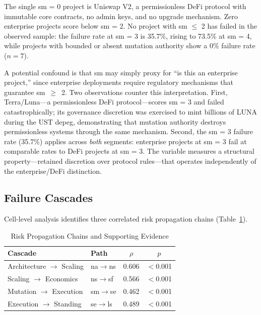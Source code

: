 \documentclass[conference]{IEEEtran}
\begin{document}
The single sm = 0 project is Uniswap V2, a permissionless DeFi protocol with immutable core contracts, no admin keys, and no upgrade mechanism. Zero enterprise projects score below sm = 2. No project with sm $\leq$ 2 has failed in the observed sample: the failure rate at sm = 3 is 35.7\%, rising to 73.5\% at sm = 4, while projects with bounded or absent mutation authority show a 0\% failure rate ($n = 7$).

A potential confound is that sm may simply proxy for ``is this an enterprise project,'' since enterprise deployments require regulatory mechanisms that guarantee sm~$\geq$~2. Two observations counter this interpretation. First, Terra/Luna---a permissionless DeFi protocol---scores sm = 3 and failed catastrophically; its governance discretion was exercised to mint billions of LUNA during the UST depeg, demonstrating that mutation authority destroys permissionless systems through the same mechanism. Second, the sm = 3 failure rate (35.7\%) applies across \textit{both} segments: enterprise projects at sm = 3 fail at comparable rates to DeFi projects at sm = 3. The variable measures a structural property---retained discretion over protocol rules---that operates independently of the enterprise/DeFi distinction.

\subsection{Failure Cascades}\label{sec:cascades}

Cell-level analysis identifies three correlated risk propagation chains (Table~\ref{tab:cascades}).

\begin{table}[htbp]
\caption{Risk Propagation Chains and Supporting Evidence}
\label{tab:cascades}
\centering
\begin{tabular}{llcc}
\toprule
\textbf{Cascade} & \textbf{Path} & \textbf{$\rho$} & \textbf{$p$} \\
\midrule
Architecture $\rightarrow$ Scaling & na$\rightarrow$ns & 0.606 & $<$0.001 \\
Scaling $\rightarrow$ Economics & ns$\rightarrow$sf & 0.566 & $<$0.001 \\
Mutation $\rightarrow$ Execution & sm$\rightarrow$se & 0.462 & $<$0.001 \\
Execution $\rightarrow$ Standing & se$\rightarrow$ls & 0.489 & $<$0.001 \\
\bottomrule
\end{tabular}
\end{table}
\end{document}
